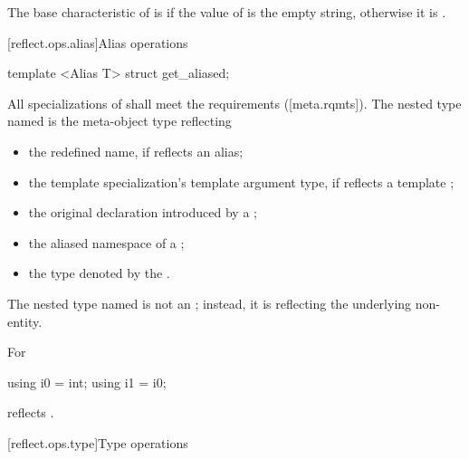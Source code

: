 \begin{std.txt}
\begin{itemdescr}
\pnum
The base characteristic of  is  if the value of  is the empty string, otherwise it is .

\end{itemdescr}
\end{std.txt}


[reflect.ops.alias]{Alias operations}

\begin{std.txt}\color{addclr}

\begin{itemdecl}
template <Alias T> struct get_aliased;
\end{itemdecl}

\begin{itemdescr}
\pnum
All specializations of  shall meet the  requirements ([meta.rqmts]). The nested type named  is the  meta-object type reflecting
\begin{itemize}
\item the redefined name, if  reflects an alias;
\item the template specialization's template argument type, if  reflects a template ;
\item the original declaration introduced by a ;
\item the aliased namespace of a ;
\item the type denoted by the .
\end{itemize}

\pnum
The nested type named  is not an ; instead, it is reflecting the underlying non- entity.

\pnum
\begin{example}
For
\begin{codeblock}
using i0 = int; using i1 = i0;
\end{codeblock}
 reflects .
\end{example}

\end{itemdescr}
\end{std.txt}

[reflect.ops.type]{Type operations}

